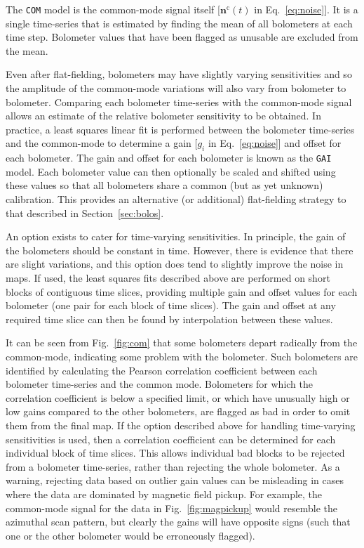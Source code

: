\documentclass[useAMS,usenatbib,nofootinbib]{mn2e}
\newcommand{\model}[1]{\texttt{#1}}
\begin{document}
The \model{COM} model is the common-mode signal itself
[$\mathbf{n}^\mathrm{c}(t)$ in Eq.~\ref{eq:noise}]. It is a single
time-series that is estimated by finding the mean of all bolometers at
each time step. Bolometer values that have been flagged as unusable
are excluded from the mean.

Even after flat-fielding, bolometers may have slightly varying
sensitivities and so the amplitude of the common-mode variations will
also vary from bolometer to bolometer. Comparing each bolometer
time-series with the common-mode signal allows an estimate of the
relative bolometer sensitivity to be obtained. In practice, a least
squares linear fit is performed between the bolometer time-series and
the common-mode to determine a gain [$g_i$ in Eq.~\ref{eq:noise}] and
offset for each bolometer.  The gain and offset for each bolometer is
known as the \model{GAI} model. Each bolometer value can then
optionally be scaled and shifted using these values so that all
bolometers share a common (but as yet unknown) calibration. This
provides an alternative (or additional) flat-fielding strategy to that
described in Section~\ref{sec:bolos}.

An option exists to cater for time-varying sensitivities. In
principle, the gain of the bolometers should be constant in
time. However, there is evidence that there are slight variations, and
this option does tend to slightly improve the noise in maps.  If used,
the least squares fits described above are performed on short blocks
of contiguous time slices, providing multiple gain and offset values
for each bolometer (one pair for each block of time slices). The gain
and offset at any required time slice can then be found by
interpolation between these values.

It can be seen from Fig.~\ref{fig:com} that some bolometers depart
radically from the common-mode, indicating some problem with the
bolometer. Such bolometers are identified by calculating the Pearson
correlation coefficient between each bolometer time-series and the
common mode. Bolometers for which the correlation coefficient is below
a specified limit, or which have unusually high or low gains compared
to the other bolometers, are flagged as bad in order to omit them from
the final map. If the option described above for handling time-varying
sensitivities is used, then a correlation coefficient can be
determined for each individual block of time slices.  This allows
individual bad blocks to be rejected from a bolometer time-series,
rather than rejecting the whole bolometer. As a warning, rejecting
data based on outlier gain values can be misleading in cases where the
data are dominated by magnetic field pickup. For example, the
common-mode signal for the data in Fig.~\ref{fig:magpickup} would
resemble the azimuthal scan pattern, but clearly the gains will have
opposite signs (such that one or the other bolometer would be
erroneously flagged).
\end{document}
